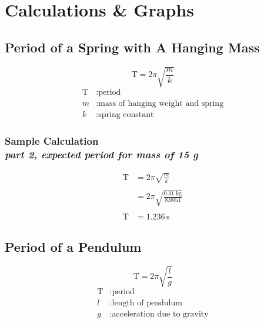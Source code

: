 
\section{Calculations \& Graphs}

\vspace{-0.5cm}
\singlespacing



\subsection{Period of a Spring with A Hanging Mass} 

{\centering
\begin{equation}
	\text{T} = 2\pi \sqrt{\frac{m}{k}}
	\label{eq:springMass}
\end{equation}
\begin{align*}
	\text{T} &: \text{period} \\
	m &: \text{mass of hanging weight and spring} \\
	k &: \text{spring constant}
\end{align*}}

\subsubsection{Sample Calculation \\ {\normalfont \small\textit{part 2, expected period for mass of 15 g}}}

{\centering
\begin{align*}
	\text{T} &= 2\pi \sqrt{\frac{m}{k}} \\ \\
					 &= 2\pi \sqrt{\frac{0.31\text{ kg}}{8.0051}} \\ \\
	\text{T}  &= \boxed{1.236\,\text{s}}
\end{align*}}

\subsection{Period of a Pendulum} 

{\centering
\begin{equation}
	\text{T} = 2\pi \sqrt{\frac{l}{g}}
	\label{eq:pendulum}
\end{equation}
\begin{align*}
	\text{T} &: \text{period} \\
	l &: \text{length of pendulum} \\
	g &: \text{acceleration due to gravity}
\end{align*}}

